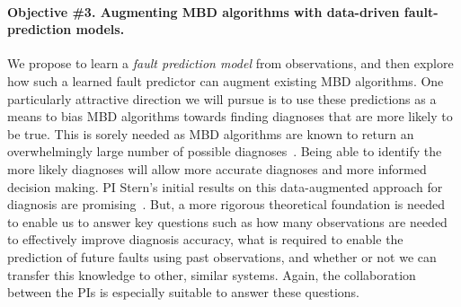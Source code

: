 \documentclass[12pt]{article}
\newcommand{\note}[1]{\textbf{\textit{#1}}}
\begin{document}
\vspace{-0.35cm}
\paragraph{Objective \#3. Augmenting MBD algorithms with data-driven fault-prediction models.} 
We propose to learn a {\em fault prediction model} from observations, and then explore how such a learned fault predictor can augment existing MBD algorithms. 
One particularly attractive direction we will pursue is to use these predictions as a means to bias MBD algorithms towards finding diagnoses that are more likely to be true. This is sorely needed as MBD algorithms are known to return an overwhelmingly large number of possible diagnoses~\cite{stern2015many}. Being able to identify the more likely diagnoses will allow more accurate diagnoses and more informed decision making. PI Stern's initial results on this data-augmented approach for diagnosis are promising~\cite{elmishali2016dataAugmented}. But, a more rigorous theoretical foundation is needed to enable us to answer key questions such as how many observations are needed to effectively improve diagnosis accuracy, what is required to enable the prediction of future faults using past observations, and whether or not we can transfer this knowledge to other, similar systems. Again, the collaboration between the PIs is especially suitable to answer these questions. 





\vspace{-0.35cm}
\end{document}
